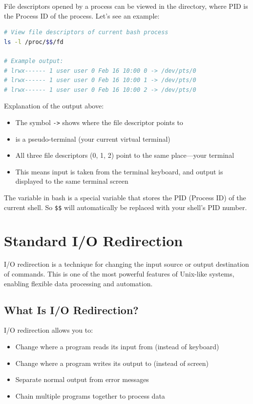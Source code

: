 File descriptors opened by a process can be viewed in the  directory, where PID is the Process ID of the process. Let's see an example:

\begin{lstlisting}[language=bash, caption={Viewing process file descriptors}]
# View file descriptors of current bash process
ls -l /proc/$$/fd

# Example output:
# lrwx------ 1 user user 0 Feb 16 10:00 0 -> /dev/pts/0
# lrwx------ 1 user user 0 Feb 16 10:00 1 -> /dev/pts/0
# lrwx------ 1 user user 0 Feb 16 10:00 2 -> /dev/pts/0
\end{lstlisting}

Explanation of the output above:
\begin{itemize}
	\item The symbol \texttt{->} shows where the file descriptor points to
	\item {} is a pseudo-terminal (your current virtual terminal)
	\item All three file descriptors (0, 1, 2) point to the same place---your terminal
	\item This means input is taken from the terminal keyboard, and output is displayed to the same terminal screen
\end{itemize}

\begin{tipbox}
	The variable \var{\$\$} in bash is a special variable that stores the PID (Process ID) of the current shell. So \texttt{\$\$} will automatically be replaced with your shell's PID number.
\end{tipbox}

\section{Standard I/O Redirection}
\label{sec:io-redirection}

I/O redirection is a technique for changing the input source or output destination of commands. This is one of the most powerful features of Unix-like systems, enabling flexible data processing and automation.

\subsection{What Is I/O Redirection?}

I/O redirection allows you to:
\begin{itemize}
	\item Change where a program reads its input from (instead of keyboard)
	\item Change where a program writes its output to (instead of screen)
	\item Separate normal output from error messages
	\item Chain multiple programs together to process data
\end{itemize}

